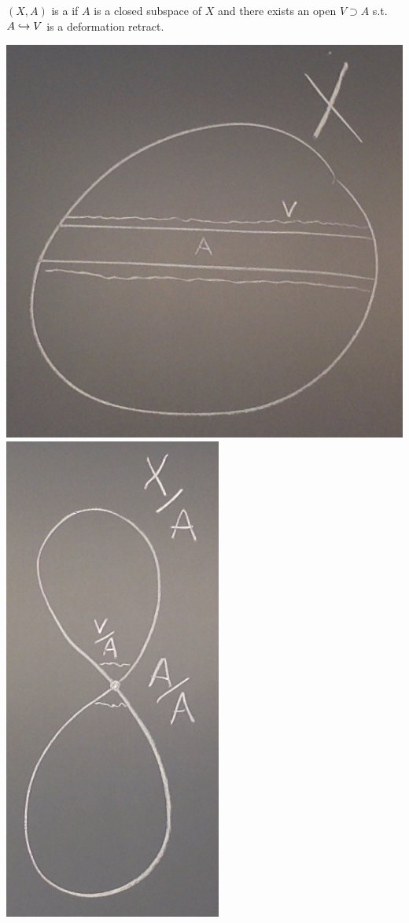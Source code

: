 \documentclass[11pt,leqno,oneside]{amsart}
\numberwithin{thm}{section}
\begin{document}
\begin{defn}
  $(X, A)$ is a  if $A$ is a closed subspace of $X$ and there exists an open $V \supset A$ s.t. $A \hookrightarrow V$ is a deformation retract.
\end{defn}
\begin{example}
  \includegraphics[scale=0.18]{images/good-pair-1} \includegraphics[scale=0.16]{images/good-pair-2}
\end{example}
\end{document}
